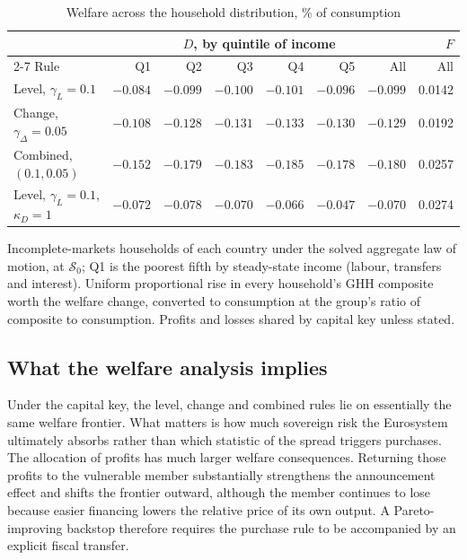 \begin{table}[tbp]
  \centering
  \begin{threeparttable}
  \caption{Welfare across the household distribution, \% of consumption}
  \label{tab:welfare-households}
  \footnotesize\setlength{\tabcolsep}{4pt}
  \begin{tabular}{l rrrrr r r}
    \toprule
    & \multicolumn{6}{c}{$D$, by quintile of income} & $F$ \\
    \cmidrule(lr){2-7}
    Rule & Q1 & Q2 & Q3 & Q4 & Q5 & All & All \\
    \midrule
    Level, $\gamma_L=0.1$ & $-0.084$ & $-0.099$ & $-0.100$ & $-0.101$ & $-0.096$ & $-0.099$ & 0.0142 \\
    Change, $\gamma_\Delta=0.05$ & $-0.108$ & $-0.128$ & $-0.131$ & $-0.133$ & $-0.130$ & $-0.129$ & 0.0192 \\
    Combined, $(0.1,0.05)$ & $-0.152$ & $-0.179$ & $-0.183$ & $-0.185$ & $-0.178$ & $-0.180$ & 0.0257 \\
    Level, $\gamma_L=0.1$, $\kappa_D=1$ & $-0.072$ & $-0.078$ & $-0.070$ & $-0.066$ & $-0.047$ & $-0.070$ & 0.0274 \\
    \bottomrule
  \end{tabular}
  \begin{tablenotes}\footnotesize
  \item Incomplete-markets households of each country under the solved aggregate law of motion, at
  $\mathcal S_0$; Q1 is the poorest fifth by steady-state income (labour, transfers and interest).
  Uniform proportional rise in every household's GHH composite worth the welfare change, converted
  to consumption at the group's ratio of composite to consumption. Profits and losses shared by
  capital key unless stated.
  \end{tablenotes}
  \end{threeparttable}
\end{table}

\subsection{What the welfare analysis implies}
\label{sec:welfare-implications}

Under the capital key, the level, change and combined rules lie on essentially the same welfare
frontier. What matters is how much sovereign risk the Eurosystem ultimately absorbs rather than which
statistic of the spread triggers purchases. The allocation of profits has much larger welfare
consequences. Returning those profits to the vulnerable member substantially strengthens the
announcement effect and shifts the frontier outward, although the member continues to lose because
easier financing lowers the relative price of its own output. A Pareto-improving backstop therefore
requires the purchase rule to be accompanied by an explicit fiscal transfer.
